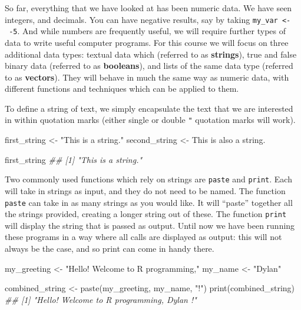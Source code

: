 \documentclass[
  letterpaper,
  DIV=11,
  numbers=noendperiod]{scrreprt}
\newenvironment{Shaded}{\begin{snugshade}}{\end{snugshade}}
\newcommand{\DocumentationTok}[1]{\textcolor[rgb]{0.37,0.37,0.37}{\textit{#1}}}
\newcommand{\FunctionTok}[1]{\textcolor[rgb]{0.28,0.35,0.67}{#1}}
\newcommand{\NormalTok}[1]{\textcolor[rgb]{0.00,0.23,0.31}{#1}}
\newcommand{\OtherTok}[1]{\textcolor[rgb]{0.00,0.23,0.31}{#1}}
\newcommand{\StringTok}[1]{\textcolor[rgb]{0.13,0.47,0.30}{#1}}
\theoremstyle{definition}
\theoremstyle{definition}
\theoremstyle{definition}
\theoremstyle{remark}
\begin{document}
So far, everything that we have looked at has been numeric data. We have
seen integers, and decimals. You can have negative results, say by
taking \texttt{my\_var\ \textless{}-\ -5}. And while numbers are
frequently useful, we will require further types of data to write useful
computer programs. For this course we will focus on three additional
data types: textual data which (referred to as \textbf{strings}), true
and false binary data (referred to as \textbf{booleans}), and lists of
the same data type (referred to as \textbf{vectors}). They will behave
in much the same way as numeric data, with different functions and
techniques which can be applied to them.

To define a string of text, we simply encapsulate the text that we are
interested in within quotation marks (either single
\texttt{\textquotesingle{}} or double \texttt{"} quotation marks will
work).

\begin{Shaded}
\begin{Highlighting}[]
\NormalTok{first\_string }\OtherTok{\textless{}{-}} \StringTok{"This is a string."}
\NormalTok{second\_string }\OtherTok{\textless{}{-}} \StringTok{\textquotesingle{}This is also a string.\textquotesingle{}}

\NormalTok{first\_string}
\DocumentationTok{\#\# [1] "This is a string."}
\end{Highlighting}
\end{Shaded}

Two commonly used functions which rely on strings are \texttt{paste} and
\texttt{print}. Each will take in strings as input, and they do not need
to be named. The function \texttt{paste} can take in as many strings as
you would like. It will ``paste'' together all the strings provided,
creating a longer string out of these. The function \texttt{print} will
display the string that is passed as output. Until now we have been
running these programs in a way where all calls are displayed as output:
this will not always be the case, and so print can come in handy there.

\begin{Shaded}
\begin{Highlighting}[]
\NormalTok{my\_greeting }\OtherTok{\textless{}{-}} \StringTok{"Hello! Welcome to R programming,"}
\NormalTok{my\_name }\OtherTok{\textless{}{-}} \StringTok{"Dylan"}

\NormalTok{combined\_string }\OtherTok{\textless{}{-}} \FunctionTok{paste}\NormalTok{(my\_greeting, my\_name, }\StringTok{"!"}\NormalTok{)}
\FunctionTok{print}\NormalTok{(combined\_string)}
\DocumentationTok{\#\# [1] "Hello! Welcome to R programming, Dylan !"}
\end{Highlighting}
\end{Shaded}
\end{document}
